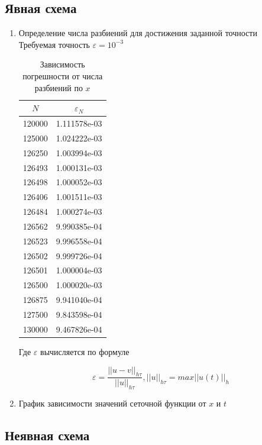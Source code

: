 \documentclass[12pt]{article}
\begin{document}
\subsection{Явная схема}
\begin{enumerate}
\item Определение числа разбиений для достижения заданной точности \\
Требуемая точность $\varepsilon = 10^{-3}$

\begin{table}[H]
\caption{Зависимость погрешности от числа разбиений по $x$ }
\begin{center}
\begin{tabular}{|c|c|}
\hline
$N$ & $\varepsilon_N$   \\
\hline
120000 &   1.111578e-03\\
\hline
125000 & 1.024222e-03  \\
\hline
126250 &  1.003994e-03 \\
\hline
126493 & 1.000131e-03  \\
\hline
126498 &  1.000052e-03 \\
\hline
126406 & 1.001511e-03  \\
\hline
126484 & 1.000274e-03  \\
\hline
126562 & 9.990385e-04  \\
\hline
126523 &  9.996558e-04 \\
\hline
126502 &  9.999726e-04 \\
\hline
126501 & 1.000004e-03  \\
\hline
126500 &  1.000020e-03 \\
\hline
126875 &  9.941040e-04 \\
\hline
127500 &  9.843598e-04 \\
\hline
130000 &  9.467826e-04 \\
\hline

\end{tabular}
\end{center}
\end{table}

Где $\varepsilon$ вычисляется по формуле

$$
\varepsilon = \dfrac{||u -v||_{h\tau}}{||u||_{h\tau}},  ||u||_{h\tau} = max||u(t)||_h
$$

\item График зависимости значений сеточной функции от $x$ и $t$
 
\end{enumerate}
\subsection{Неявная схема}
\end{document}

